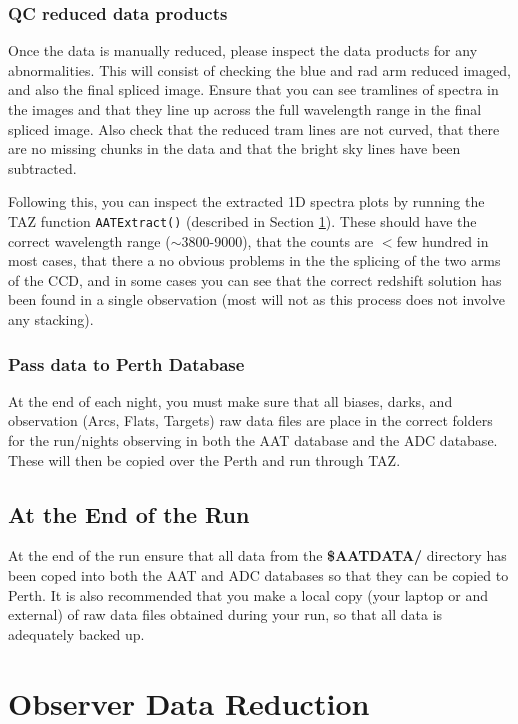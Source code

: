 \documentclass[12pt]{article}
\begin{document}
\subsubsection{QC reduced data products}

Once the data is manually reduced, please inspect the data products for any abnormalities. This will consist of checking the blue and rad arm reduced imaged, and also the final spliced image. Ensure that you can see tramlines of spectra in the images and that they line up across the full wavelength range in the final spliced image. Also check that the reduced tram lines are not curved, that there are no missing chunks in the data and that the bright sky lines have been subtracted. 

Following this, you can inspect the extracted 1D spectra plots by running the TAZ function \texttt{AATExtract()} (described in Section \ref{sec:Reduc}). These should have the correct wavelength range ($\sim$3800-9000), that the counts are $<$few hundred in most cases, that there a no obvious problems in the the splicing of the two arms of the CCD, and in some cases you can see that the correct redshift solution has been found in a single observation (most will not as this process does not involve any stacking).


\subsubsection{Pass data to Perth Database}

At the end of each night, you must make sure that all biases, darks, and observation (Arcs, Flats, Targets) raw data files are place in the correct folders for the run/nights observing in both the AAT database and the ADC database. These will then be copied over the Perth and run through TAZ. 


\subsection{At the End of the Run}

At the end of the run ensure that all data from the \textbf{\$AATDATA/} directory has been coped into both the AAT and ADC databases so that they can be copied to Perth. It is also recommended that you make a local copy (your laptop or and external) of raw data files obtained during your run, so that all data is adequately backed up.  

\section{Observer Data Reduction}
\label{sec:Reduc}
\end{document}
